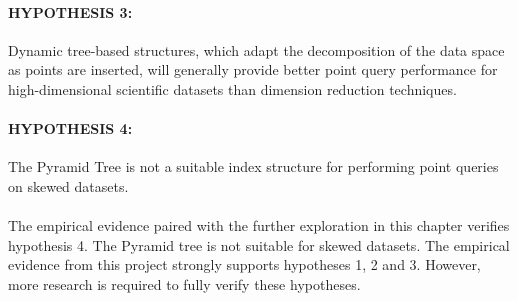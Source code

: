 \paragraph{\textbf{HYPOTHESIS 3:}} Dynamic tree-based structures, which adapt the decomposition of the data space as points are inserted, will generally provide better point query performance for high-dimensional scientific datasets than dimension reduction techniques.

\paragraph{\textbf{HYPOTHESIS 4:}} The Pyramid Tree is not a suitable index structure for performing point queries on skewed datasets.

\paragraph{}


The empirical evidence paired with the further exploration in this chapter verifies hypothesis 4. The Pyramid tree is not suitable for skewed datasets. The empirical evidence from this project strongly supports hypotheses 1, 2 and 3. However, more research is required to fully verify these hypotheses.